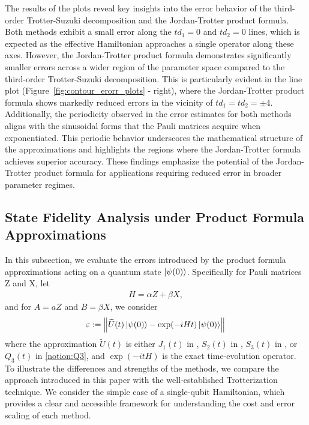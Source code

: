 \documentclass{article}
\theoremstyle{plain} %
\numberwithin{equation}{section}
\begin{document}
The results of the plots reveal key insights into the error behavior of the third-order Trotter-Suzuki decomposition and the Jordan-Trotter product formula. Both methods exhibit a small error along the $td_1 = 0$ and $td_2=0$ lines, which is expected as the effective Hamiltonian approaches a single operator along these axes. However, the Jordan-Trotter product formula demonstrates significantly smaller errors across a wider region of the parameter space compared to the third-order Trotter-Suzuki decomposition. This is particularly evident in the line plot (Figure~\ref{fig:contour_erorr_plots} - right), where the Jordan-Trotter product formula shows markedly reduced errors in the vicinity of $td_1 = td_2 = \pm 4$. Additionally, the periodicity observed in the error estimates for both methods aligns with the sinusoidal forms that the Pauli matrices acquire when exponentiated. This periodic behavior underscores the mathematical structure of the approximations and highlights the regions where the Jordan-Trotter formula achieves superior accuracy. These findings emphasize the potential of the Jordan-Trotter product formula for applications requiring reduced error in broader parameter regimes.


\subsection{State Fidelity Analysis under Product Formula Approximations}\label{sec:statefidelity}

In this subsection, we evaluate the errors introduced by the product formula approximations acting on a quantum state $\ket{\psi(0)}$. 
Specifically for Pauli matrices Z and X, let
\begin{align}
    H = \alpha Z + \beta X,
\end{align}
\noindent
and for $A=aZ$ and $B=\beta X$, we consider
\begin{align}\label{eqt:error:state}
   \varepsilon:= \left\Vert\widetilde{U}(t)\ket{\psi(0)}-\exp(-iHt)\ket{\psi(0)} \right\Vert 
\end{align}
where the approximation $\widetilde{U}(t)$ is either $J_1(t)$ in , $S_2(t)$ in , $S_3(t)$ in , or $Q_3(t)$ in \cref{notion:Q3}, and $\exp\left({-itH}\right)$ is the exact time-evolution operator. To illustrate the differences and strengths of the methods, we compare the approach introduced in this paper with the well-established Trotterization technique. We consider the simple case of a single-qubit Hamiltonian, which provides a clear and accessible framework for understanding the cost and error scaling of each method.  
\end{document}
